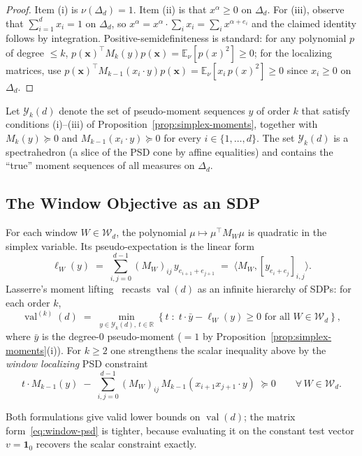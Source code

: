 \documentclass[11pt, letterpaper]{article}
\theoremstyle{paperplain}
\theoremstyle{paperdef}
\newcommand{\R}{\mathbb{R}}
\newcommand{\E}{\mathbb{E}}
\newcommand{\val}{\operatorname{val}}
\newcommand{\PSD}{\succeq 0}
\begin{document}
\begin{proof}
Item (i) is $\nu(\Delta_d)=1$.  Item (ii) is that $x^\alpha\ge 0$ on
$\Delta_d$.  For (iii), observe that
$\sum_{i=1}^d x_i = 1$ on $\Delta_d$, so
$x^\alpha = x^\alpha\cdot\sum_i x_i = \sum_i x^{\alpha+e_i}$ and the
claimed identity follows by integration.  Positive-semidefiniteness
is standard: for any polynomial $p$ of degree $\le k$,
$p(\mathbf{x})^\top M_k(y) p(\mathbf{x}) = \E_\nu[p(x)^2]\ge 0$; for
the localizing matrices, use $p(\mathbf{x})^\top
M_{k-1}(x_i\cdot y)p(\mathbf{x}) = \E_\nu[x_i\,p(x)^2]\ge 0$ since
$x_i\ge 0$ on $\Delta_d$.
\end{proof}

Let $\mathcal{Y}_k(d)$ denote the set of pseudo-moment sequences $y$ of
order $k$ that satisfy conditions (i)--(iii) of
Proposition~\ref{prop:simplex-moments}, together with $M_k(y)\PSD$
and $M_{k-1}(x_i\cdot y)\PSD$ for every $i\in\{1,\ldots,d\}$.  The set
$\mathcal{Y}_k(d)$ is a spectrahedron (a slice of the PSD cone by
affine equalities) and contains the ``true'' moment sequences of all
measures on $\Delta_d$.

\subsection{The Window Objective as an SDP}\label{subsec:window-psd}

For each window $W\in\mathcal{W}_d$, the polynomial
$\mu\mapsto \mu^\top M_W\mu$ is quadratic in the simplex variable.  Its
pseudo-expectation is the linear form
\[
  \ell_W(y)
  \;=\;
  \sum_{i,j=0}^{d-1} (M_W)_{ij}\,y_{e_{i+1}+e_{j+1}}
  \;=\;
  \langle M_W, [y_{e_i+e_j}]_{i,j}\rangle.
\]
Lasserre's moment lifting~\cite[Thm.~4.2]{Lasserre2001} recasts
$\val(d)$ as an infinite hierarchy of SDPs: for each order $k$,
\[
  \val^{(k)}(d)
  \;=\;
  \min_{y\in\mathcal{Y}_k(d),\ t\in\R}
  \left\{
    t
    \;:\;
    t\cdot \bar y - \ell_W(y) \ge 0
    \text{ for all } W\in\mathcal{W}_d
  \right\},
\]
where $\bar y$ is the degree-$0$ pseudo-moment ($=1$ by
Proposition~\ref{prop:simplex-moments}(i)).  For $k\ge 2$ one
strengthens the scalar inequality above by the \emph{window
localizing} PSD constraint
\begin{equation}\label{eq:window-psd}
  t\cdot M_{k-1}(y)
  \;-\;
  \sum_{i,j=0}^{d-1}(M_W)_{ij}\,M_{k-1}(x_{i+1}x_{j+1}\cdot y)
  \;\PSD
  \qquad
  \forall\, W\in\mathcal{W}_d.
\end{equation}

Both formulations give valid lower bounds on $\val(d)$; the matrix
form~\eqref{eq:window-psd} is tighter, because evaluating it on the
constant test vector $v=\mathbf{1}_0$ recovers the scalar constraint
exactly.
\end{document}
